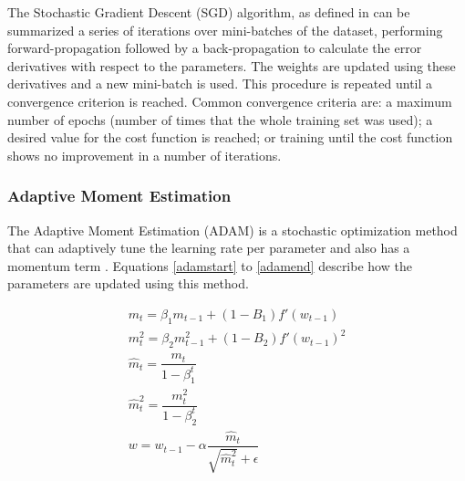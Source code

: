 The Stochastic Gradient Descent (SGD) algorithm, as defined in \cite{bishop2006pattern} can be summarized a series of iterations over mini-batches of the dataset, performing forward-propagation
followed by a back-propagation to calculate the error derivatives with respect to the
parameters. The weights are updated using these derivatives and a new mini-batch is
used. This procedure is repeated until a convergence criterion is reached. Common
convergence criteria are: a maximum number of epochs (number of times that the whole
training set was used); a desired value for the cost function is reached; or training until
the cost function shows no improvement in a number of iterations.

\subsubsection{Adaptive Moment Estimation}
The Adaptive Moment Estimation (ADAM) is a stochastic optimization method that can adaptively tune the learning rate per parameter and also has a momentum term \cite{polyak1964some}. Equations \ref{adamstart} to \ref{adamend} describe how the parameters are updated using this method.

\begin{subequations}\label{eq:adam}
\begin{gather}
m_{t} = \beta_{1} m_{t-1} + (1-B_{1})f'(w_{t-1}) \label{adamstart}
\\
m_{t}^2 = \beta_{2} m_{t-1}^2 + (1-B_{2})f'(w_{t-1})^2
\\
\hat{m}_{t} = \dfrac{m_{t}}{1-\beta_{1}^t}
\\
\hat{m}_{t}^2 = \dfrac{m_{t}^2}{1-\beta_{2}^t}
\\
w = w_{t-1} - \alpha \dfrac{\hat{m}_{t}}{ 
\sqrt{\hat{m}_{t}^2} + \epsilon 
}
\label{adamend}
\end{gather}
\end{subequations}


